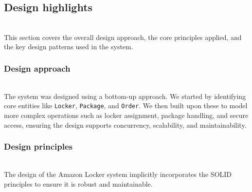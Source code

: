 \subsection{Design highlights}\label{LGopN2LHpQzQzFtgKfEIj}
\\
This section covers the overall design approach, the core principles applied, and the key design patterns used in the system.

\subsubsection{Design approach}\label{f2E5xpX3VQ38HN--gtqol}
\\
The system was designed using a bottom-up approach. We started by identifying core entities like \texttt{Locker}, \texttt{Package}, and \texttt{Order}. We then built upon these to model more complex operations such as locker assignment, package handling, and secure access, ensuring the design supports concurrency, scalability, and maintainability.

\subsubsection{Design principles}\label{YFXA2SvHGMtphFsPNn5gz}
\\
The design of the Amazon Locker system implicitly incorporates the SOLID principles to ensure it is robust and maintainable.

